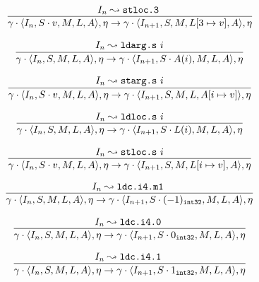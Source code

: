 \documentclass[declaration,shortabstract,english,mgr]{iithesis}
\newcommand{\mstate}[5] {
	\langle#1, #2, #3, #4, #5\rangle
}
\newcommand{\ipointsto}[3] {
	#1 \leadsto \texttt{#2} \text{ } #3
}
\newcommand{\sval}[2] {
	#1_\texttt{#2}
}
\newcommand{\setarrayitem}[3] {
	#1[#2 \mapsto #3]
}
\begin{document}
\begin{equation}
\label{eq:semantics_stloc3}
	\infer{
		\gamma \cdot \mstate{I_n}{S \cdot v}{M}{L}{A}, \eta
			\rightarrow
		\gamma \cdot \mstate{I_{n+1}}{S}{M}{\setarrayitem{L}{3}{v}}{A}, \eta
	}
	{\ipointsto{I_n}{stloc.3}}
\end{equation}

\begin{equation}
\label{eq:semantics_ldargs}
	\infer{
		\gamma \cdot \mstate{I_n}{S}{M}{L}{A}, \eta
			\rightarrow
		\gamma \cdot \mstate{I_{n+1}}{S \cdot A(i)}{M}{L}{A}, \eta
	}
	{\ipointsto{I_n}{ldarg.s}{i}}
\end{equation}

\begin{equation}
\label{eq:semantics_stargs}
	\infer{
		\gamma \cdot \mstate{I_n}{S \cdot v}{M}{L}{A}, \eta
			\rightarrow
		\gamma \cdot \mstate{I_{n+1}}{S}{M}{L}{\setarrayitem{A}{i}{v}}, \eta
	}
	{\ipointsto{I_n}{starg.s}{i}}
\end{equation}

\begin{equation}
\label{eq:semantics_ldlocs}
	\infer{
		\gamma \cdot \mstate{I_n}{S}{M}{L}{A}, \eta
			\rightarrow
		\gamma \cdot \mstate{I_{n+1}}{S \cdot L(i)}{M}{L}{A}, \eta
	}
	{\ipointsto{I_n}{ldloc.s}{i}}
\end{equation}

\begin{equation}
\label{eq:semantics_stlocs}
	\infer{
		\gamma \cdot \mstate{I_n}{S \cdot v}{M}{L}{A}, \eta
			\rightarrow
		\gamma \cdot \mstate{I_{n+1}}{S}{M}{\setarrayitem{L}{i}{v}}{A}, \eta
	}
	{\ipointsto{I_n}{stloc.s}{i}}
\end{equation}

\begin{equation}
\label{eq:semantics_ldci4m1}
	\infer{
		\gamma \cdot \mstate{I_n}{S}{M}{L}{A}, \eta
			\rightarrow
		\gamma \cdot \mstate{I_{n+1}}{S \cdot \sval{(-1)}{int32}}{M}{L}{A}, \eta
	}
	{\ipointsto{I_n}{ldc.i4.m1}}
\end{equation}

\begin{equation}
\label{eq:semantics_ldci40}
	\infer{
		\gamma \cdot \mstate{I_n}{S}{M}{L}{A}, \eta
			\rightarrow
		\gamma \cdot \mstate{I_{n+1}}{S \cdot \sval{0}{int32}}{M}{L}{A}, \eta
	}
	{\ipointsto{I_n}{ldc.i4.0}}
\end{equation}

\begin{equation}
\label{eq:semantics_ldci41}
	\infer{
		\gamma \cdot \mstate{I_n}{S}{M}{L}{A}, \eta
			\rightarrow
		\gamma \cdot \mstate{I_{n+1}}{S \cdot \sval{1}{int32}}{M}{L}{A}, \eta
	}
	{\ipointsto{I_n}{ldc.i4.1}}
\end{equation}
\end{document}
